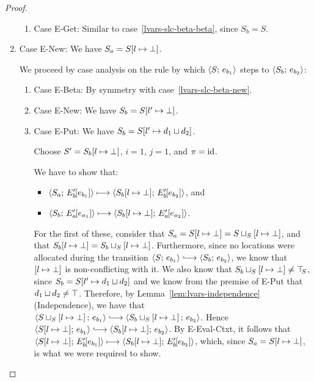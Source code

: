 \begin{proof}
\begin{enumerate}
\begin{enumerate}
    \item \label{lvars-slc-beta-get}Case {\sc E-Get}: Similar to
      case~\ref{lvars-slc-beta-beta}, since $S_b = S$.

    \end{enumerate}
  \item Case {\sc E-New}: We have $S_a = S[l \mapsto \bot]$.

    We proceed by case analysis on the rule by which
    $\langle S;\, e_{b_1} \rangle$ steps to $\langle S_b;\, e_{b_2} \rangle$:
    \begin{enumerate}
    \item \label{lvars-slc-new-beta}Case {\sc E-Beta}: By symmetry with case~\ref{lvars-slc-beta-new}.
    \item Case {\sc E-New}: We have $S_b = S[l' \mapsto \bot]$. 

      \TODO{}

    \item Case {\sc E-Put}: We have $S_b =
      S[l' \mapsto d_1 \sqcup d_2]$.

      Choose $S' =
      S_b[l \mapsto \bot]$, $i =
      1$, $j = 1$, and $\pi = \mathrm{id}$.

      We have to show that:
      \begin{itemize}
      \item $\langle S_a;\, E'_b\hspace{-1mm}\left[e_{b_1}\right] \rangle \longmapsto
        \langle S_b[l \mapsto \bot];\, E'_b\hspace{-1mm}\left[e_{b_2}\right] \rangle$,
        and
      \item
        $\langle S_b;\, E'_a\hspace{-1mm}\left[e_{a_1}\right] \rangle \longmapsto
        \langle S_b[l \mapsto \bot];\, E'_a\hspace{-1mm}\left[e_{a_2}\right] \rangle$.
      \end{itemize}

      For the first of these, consider that $S_a =
      S[l \mapsto \bot] =
      S \sqcup_{S} \left[ l \mapsto \bot \right]$, and that
      $S_b[l \mapsto \bot] =
      S_b \sqcup_{S} \left[ l \mapsto \bot \right]$.
      Furthermore, since no locations were allocated during the
      transition $\config{S}{e_{b_1}} \parstepsto
      \config{S_b}{e_{b_2}}$, we know that
      $\left[ l \mapsto \bot \right]$ is non-conflicting with it.
      We also know that
      $S_b \sqcup_{S} \left[ l \mapsto \bot \right] \neq \top\hspace{-0.85mm}_{S}$,
      since $S_b = S[l' \mapsto d_1 \sqcup d_2]$ and we know
      from the premise of {\sc E-Put} that $d_1 \sqcup d_2 \neq
      \top$.  Therefore, by Lemma~\ref{lem:lvars-independence}
      (Independence), we have that
      $\config{\lubstore{S}{\store{\storebindingRaw{l}{\bot}}}}{e_{b_1}}
      \parstepsto
      \config{\lubstore{S_b}{\store{\storebindingRaw{l}{\bot}}}}{e_{b_2}}$.
      Hence $\config{\extSRaw{S}{l}{\bot}}{e_{b_1}} \parstepsto
      \config{\extSRaw{S_b}{l}{\bot}}{e_{b_2}}$.  By {\sc
        E-Eval-Ctxt}, it follows that
      $\langle S[l \mapsto \bot];\, E'_b\hspace{-1mm}\left[e_{b_1}\right] \rangle
      \longmapsto
      \langle S_b[l \mapsto \bot];\, E'_b\hspace{-1mm}\left[e_{b_2}\right] \rangle$,
      which, since $S_a = S[l \mapsto \bot]$, is what we were
      required to show.


\end{enumerate}
\end{enumerate}
\end{proof}
